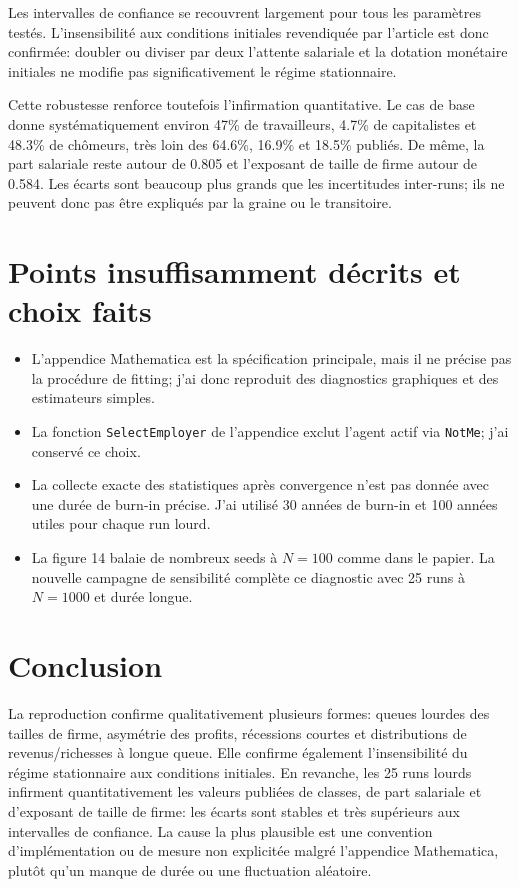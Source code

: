 \documentclass[11pt,a4paper]{article}
\begin{document}
Les intervalles de confiance se recouvrent largement pour tous les paramètres testés. L'insensibilité aux conditions initiales revendiquée par l'article est donc confirmée: doubler ou diviser par deux l'attente salariale et la dotation monétaire initiales ne modifie pas significativement le régime stationnaire.

Cette robustesse renforce toutefois l'infirmation quantitative. Le cas de base donne systématiquement environ 47\% de travailleurs, 4.7\% de capitalistes et 48.3\% de chômeurs, très loin des 64.6\%, 16.9\% et 18.5\% publiés. De même, la part salariale reste autour de 0.805 et l'exposant de taille de firme autour de 0.584. Les écarts sont beaucoup plus grands que les incertitudes inter-runs; ils ne peuvent donc pas être expliqués par la graine ou le transitoire.

\section{Points insuffisamment décrits et choix faits}

\begin{itemize}
  \item L'appendice Mathematica est la spécification principale, mais il ne précise pas la procédure de fitting; j'ai donc reproduit des diagnostics graphiques et des estimateurs simples.
  \item La fonction \texttt{SelectEmployer} de l'appendice exclut l'agent actif via \texttt{NotMe}; j'ai conservé ce choix.
  \item La collecte exacte des statistiques après convergence n'est pas donnée avec une durée de burn-in précise. J'ai utilisé 30 années de burn-in et 100 années utiles pour chaque run lourd.
  \item La figure 14 balaie de nombreux seeds à $N=100$ comme dans le papier. La nouvelle campagne de sensibilité complète ce diagnostic avec 25 runs à $N=1000$ et durée longue.
\end{itemize}

\section{Conclusion}

La reproduction confirme qualitativement plusieurs formes: queues lourdes des tailles de firme, asymétrie des profits, récessions courtes et distributions de revenus/richesses à longue queue. Elle confirme également l'insensibilité du régime stationnaire aux conditions initiales. En revanche, les 25 runs lourds infirment quantitativement les valeurs publiées de classes, de part salariale et d'exposant de taille de firme: les écarts sont stables et très supérieurs aux intervalles de confiance. La cause la plus plausible est une convention d'implémentation ou de mesure non explicitée malgré l'appendice Mathematica, plutôt qu'un manque de durée ou une fluctuation aléatoire.
\end{document}
